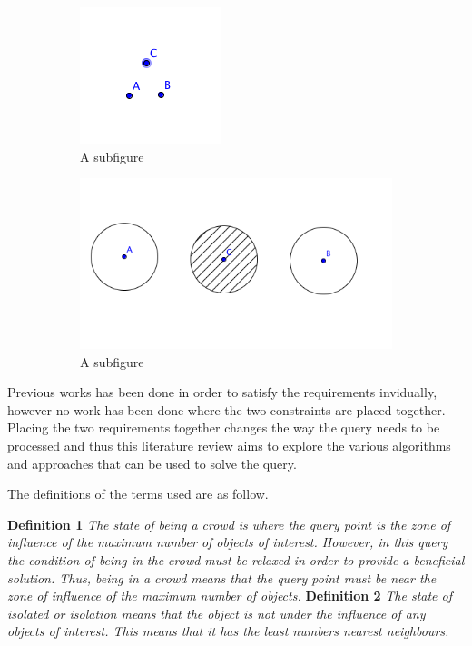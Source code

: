\documentclass[a4paper,11pt]{article}
\begin{document}
\begin{figure}[h]
\centering
\begin{subfigure}{.4\textwidth}
  \centering
  \includegraphics[width=.4\linewidth]{3OOI}
  \caption{A subfigure}
  \label{fig:3OOI}
\end{subfigure}%
\begin{subfigure}{.4\textwidth}
  \centering
  \includegraphics[width=.4\linewidth]{2OOIFarSolution}
  \caption{A subfigure}
  \label{fig:2OOIFarSolution}
\end{subfigure}
\caption{}
\label{fig:Condition}
\end{figure}


Previous works has been done in order to satisfy the requirements invidually,  however no work has been done where the two constraints are placed together. Placing the two requirements together changes the way the query needs to be processed and thus this literature review aims to explore the various algorithms and approaches that can be used to solve the query. 

The definitions of the terms used are as follow.

\textbf{Definition 1} \textit{The state of being a crowd is where the query point is the zone of influence of the maximum number of objects of interest. However, in this query the condition of being in the crowd must be relaxed in order to provide a beneficial solution. Thus, being in a crowd means that the query point must be near the zone of influence of the maximum number of objects.
}
\textbf{Definition 2} \textit{The state of isolated or isolation means that the object is not under the influence of any objects of interest. This means that it has the least numbers nearest neighbours. }
\end{document}
